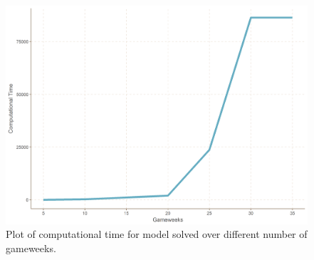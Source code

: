 \begin{table}[H]
\centering
{}
\caption{Model run with different number of gameweeks.}
\label{tab:realized_points_diff_gameweeks}
\end{table}

\begin{figure}[H]
\label{fig:solutions_found_realized_points}    
    \centering
    \includegraphics[scale=0.75]{fig/chapter_7/comp_time.png}
    \caption{Plot of computational time for model solved over different number of gameweeks.}
\end{figure}

